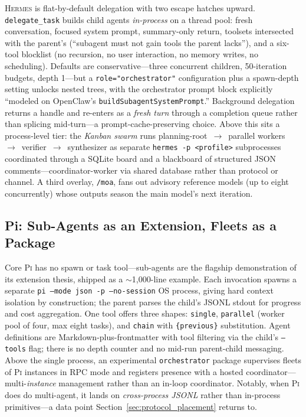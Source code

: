 \documentclass[11pt,a4paper]{article}
\newcommand{\hrm}{\textsc{Hermes}\xspace}
\newcommand{\pib}{\textsc{Pi}\xspace}
\begin{document}
\hrm{} is flat-by-default delegation with two escape hatches upward.
\texttt{delegate\_task} builds child agents \emph{in-process} on a thread pool: fresh conversation, focused system prompt, summary-only return, toolsets intersected with the parent's (``subagent must not gain tools the parent lacks''), and a six-tool blocklist (no recursion, no user interaction, no memory writes, no scheduling).
Defaults are conservative---three concurrent children, 50-iteration budgets, depth 1---but a \texttt{role="orchestrator"} configuration plus a spawn-depth setting unlocks nested trees, with the orchestrator prompt block explicitly ``modeled on OpenClaw's \texttt{buildSubagentSystemPrompt}.''
Background delegation returns a handle and re-enters as a \emph{fresh turn} through a completion queue rather than splicing mid-turn---a prompt-cache-preserving choice.
Above this sits a process-level tier: the \emph{Kanban swarm} runs planning-root~$\to$~parallel workers~$\to$~verifier~$\to$~synthesizer as separate \texttt{hermes -p <profile>} subprocesses coordinated through a SQLite board and a blackboard of structured JSON comments---coordinator-worker via shared database rather than protocol or channel.
A third overlay, \texttt{/moa}, fans out advisory reference models (up to eight concurrently) whose outputs season the main model's next iteration.

\subsection{Pi: Sub-Agents as an Extension, Fleets as a Package}

Core \pib{} has no spawn or task tool---sub-agents are the flagship demonstration of its extension thesis, shipped as a $\sim$1{,}000-line example.
Each invocation spawns a separate \texttt{pi --mode json -p --no-session} OS process, giving hard context isolation by construction; the parent parses the child's JSONL stdout for progress and cost aggregation.
One tool offers three shapes: \texttt{single}, \texttt{parallel} (worker pool of four, max eight tasks), and \texttt{chain} with \texttt{\{previous\}} substitution.
Agent definitions are Markdown-plus-frontmatter with tool filtering via the child's \texttt{--tools} flag; there is no depth counter and no mid-run parent-child messaging.
Above the single process, an experimental \texttt{orchestrator} package supervises fleets of \pib{} instances in RPC mode and registers presence with a hosted coordinator---multi-\emph{instance} management rather than an in-loop coordinator.
Notably, when \pib{} does do multi-agent, it lands on \emph{cross-process JSONL} rather than in-process primitives---a data point Section~\ref{sec:protocol_placement} returns to.
\end{document}
